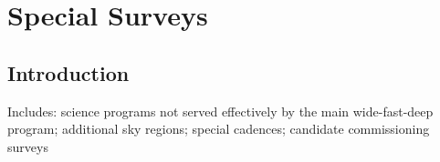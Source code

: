\chapter[Special Surveys]{Special Surveys}
\def\chpname{specialsurveys}\label{chp:\chpname}





\section{Introduction}
\label{sec:specials:intro}


Includes: science programs not served effectively by the main
wide-fast-deep program; additional sky regions; special cadences;
candidate commissioning surveys





% 


\navigationbar
